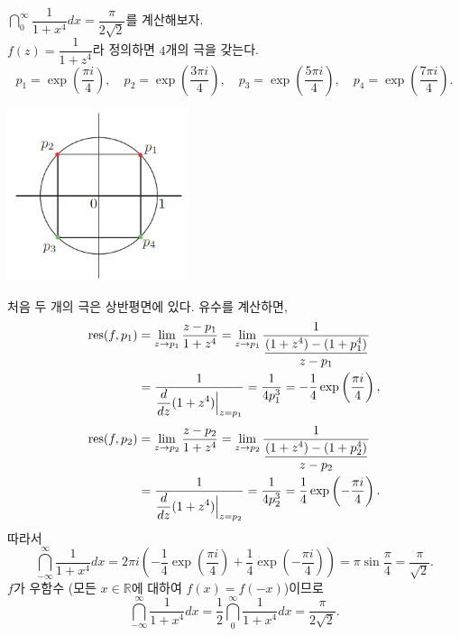 \begin{saltexample}[label=example-4-19]{}{}
$\dint_0^ \infty \dfrac1{1+x^4}dx = \dfrac{\pi}{2\sqrt{2}}$를 계산해보자.\\[1ex]
$f(z) = \dfrac1{1+z^4}$라 정의하면 $4$개의 극을 갖는다.
\[
p_1 = \exp\left(\dfrac{\pi i}4\right), \quad
p_2 = \exp\left(\dfrac{3\pi i}4\right), \quad
p_3 = \exp\left(\dfrac{5\pi i}4\right), \quad
p_4 = \exp\left(\dfrac{7\pi i}4\right).
\]
\begin{center}
\includegraphics[width=0.4\textwidth]{./SaltChapter/figs/fig-4-0-12}
\end{center}
\saltfigskip

처음 두 개의 극은 상반평면에 있다. 유수를 계산하면,
\begin{align*}
\mathop{\mathrm{res}}(f,p_1) &= \lim_{z\to p_1} \displaystyle\frac{z-p_1}{1+z^4} 
= \lim_{z\to p_1} \displaystyle\frac1{\displaystyle\frac{(1+z^4) - (1+p_1^4)}{z-p_1}} \\
&= \displaystyle\frac1{\displaystyle\frac{d}{dz}(1+z^4)\Big|_{z=p_1}} = \displaystyle\frac1{4p_1^3}
= - \displaystyle\frac14 \exp\left(\displaystyle\frac{\pi i}4\right),
\end{align*}
\begin{align*}
\mathop{\mathrm{res}}(f,p_2) &= \lim_{z\to p_2} \displaystyle\frac{z-p_2}{1+z^4} 
= \lim_{z\to p_2} \displaystyle\frac1{\displaystyle\frac{(1+z^4) - (1+p_2^4)}{z-p_2}} \\
&= \displaystyle\frac1{\displaystyle\frac{d}{dz}(1+z^4)\Big|_{z=p_2}} = \displaystyle\frac1{4p_2^3}
= \displaystyle\frac14 \exp\left(-\displaystyle\frac{\pi i}4\right).
\end{align*}
따라서
\[
\dint_{-\infty}^ \infty \dfrac1{1+x^4}dx
= 2\pi i \left( - \dfrac14 \exp\left(\dfrac{\pi i}4\right)
+ \dfrac14 \exp\left(-\dfrac{\pi i}4\right) \right)
= \pi \sin \dfrac\pi 4 = \dfrac\pi{\sqrt{2}}.
\]
$f$가 우함수 (모든 $x\in\mathbb R$에 대하여 $f(x)=f(-x)$)이므로
\[
\dint_{-\infty}^ \infty \dfrac1{1+x^4}dx = \dfrac12 
\dint_0^ \infty \dfrac1{1+x^4}dx = \dfrac{\pi}{2\sqrt{2}}.
\]
\end{saltexample}


